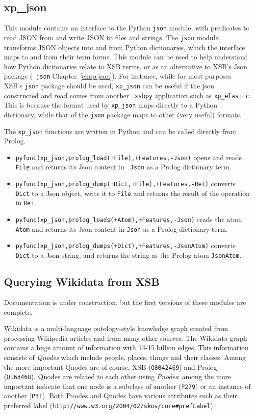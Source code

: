\subsection{xp\_json}
This module contains an interface to the Python {\tt json} module,
with predicates to read JSON from and write JSON to files and strings.
The {\tt json} module transforms JSON objects into and from Python
dictionaries, which the interface maps to and from their term forms.
This module can be used to help understand how Python dictionaries
relate to XSB terms, or as an alternative to XSB's Json package ({\tt
  json} Chapter~\ref{chap:json}).  For instance, while for most
purposes XSB's {\tt json} package should be used, {\tt xp\_json} can
be useful if the json constructed and read comes from another {\tt
  xsbpy} application such as {\tt xp\_elastic}.  This is because the
format used by {\tt xp\_json} maps directly to a Python dictionary,
while that of the {\tt json} package maps to other (very useful)
formats.

The {\tt xp\_json} functions are written in Python and can be
called directly from Prolog.
\begin{itemize}
\item {\tt pyfunc(xp\_json,prolog\_load(+File),+Features,-Json)}
  opens and reads {\tt File} and returns its Json content in {\tt
    Json} as a Prolog dictionary term.
\item {\tt pyfunc(xp\_json,prolog\_dump(+Dict,+File),+Features,-Ret)}
  converts {\tt Dict} to a Json object, write it to {\tt File} and
  returns the result of the operation in {\tt Ret}.
\item {\tt pyfunc(xp\_json,prolog\_loads(+Atom),+Features,-Json)}
  reads the atom {\tt Atom} and returns its Json content in {\tt Json}
  as a Prolog dictionary term.
\item {\tt  pyfunc(xp\_json,prolog\_dumps(+Dict),+Features,-JsonAtom)}
  converts {\tt Dict} to a Json string, and returns the string as the
  Prolog atom {\tt JsonAtom}.
\end{itemize}  

\subsection{Querying Wikidata from XSB}
%
{\sc Documentation is under construction, but the first versions of
  these modules are complete.}

Wikidata is a multi-language ontology-style knowledge graph created
from processing Wikipedia articles and from many other sources.  The
Wikidata graph contains a huge amount of information with 14-15
billion edges, This information consists of {\em Qnodes} which include
people, places, things and their classes.  Among the more important
Qnodes are of course, XSB ({\tt Q8042469}) and Prolog ({\tt Q163468}).
Qnodes are related to each other using {\em Pnodes}: among the more
important indicate that one node is a subclass of another ({\tt P279})
or an instance of another ({\tt P31}).  Both Pnodes and Qnodes have
various attributes such as their preferred label
(\verb|http://www.w3.org/2004/02/skos/core#prefLabel|).

